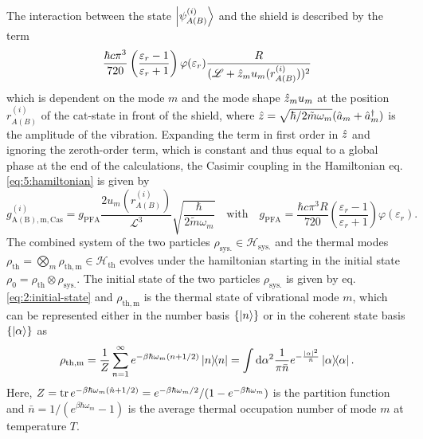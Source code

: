The interaction between the state $\ket{\psi^{(i)}_{A(B)}}$ and the shield is described by the term 
\begin{equation}
  \frac{\hbar c \pi^3}{720}\left(\frac{\varepsilon_r - 1}{\varepsilon_r + 1}\right) \varphi(\varepsilon_r) \frac{R}{(\mathscr{L} + \hat{z}_m u_m(r^{(i)}_{A(B)}))^2}
\end{equation}
which is dependent on the mode $m$ and the mode shape $\hat{z}_m u_m$ at the position $r^{(i)}_{A(B)}$ of the cat-state in front of the shield, where $\hat{z} = \sqrt{\hbar/2\tilde{m}\omega_m}(\hat{a}_m + \hat{a}^\dagger_m)$ is the amplitude of the vibration.
Expanding the term in first order in $\hat{z}$ and ignoring the zeroth-order term, which is constant and thus equal to a global phase at the end of the calculations, the Casimir coupling in the Hamiltonian eq. \eqref{eq:5:hamiltonian} is given by
\begin{equation}
  g^{(i)}_\mathrm{A(B),m,Cas} = g_\mathrm{PFA} \frac{2 u_m(r^{(i)}_{A(B)})}{\mathscr{L}^3} \sqrt{\frac{\hbar}{2\tilde{m}\omega_m}}
  \quad \text{with} \quad 
  g_\mathrm{PFA} = \frac{\hbar c \pi^3 R}{720} \left(\frac{\varepsilon_r - 1}{\varepsilon_r + 1}\right) \varphi(\varepsilon_r) .
\end{equation} 
The combined system of the two particles $\rho_\mathrm{sys.} \in \mathcal{H}_\mathrm{sys.}$ and the thermal modes $\rho_\mathrm{th} = \bigotimes_m \rho_\mathrm{th, m} \in \mathcal{H}_\mathrm{th}$ evolves under the hamiltonian starting in the initial state $\rho_0 = \rho_\mathrm{th} \otimes \rho_\mathrm{sys.}$. 
The initial state of the two particles $\rho_\mathrm{sys.}$ is given by eq. \eqref{eq:2:initial-state} and $\rho_\mathrm{th,m}$ is the thermal state of vibrational mode $m$, which can be represented either in the number basis $\{\ket{n}\}$ or in the coherent state basis $\{\ket{\alpha}\}$ as \cite{Steiner_2024}
\begin{equation}
  \rho_\mathrm{th,m} = \frac{1}{Z} \sum_{n=1}^\infty e^{-\beta \hbar \omega_m (n + 1/2)} \ketbra{n} = \int \dd \alpha^2 \frac{1}{\pi \bar{n}} e^{-\frac{\left\lvert\alpha\right\rvert^2}{\bar{n}}} \ketbra{\alpha} .
\end{equation} 
Here, $Z = \tr e^{-\beta \hbar \omega_m (\hat{n}+1/2)} = e^{-\beta \hbar \omega_m/2}/(1-e^{-\beta \hbar \omega_m})$ is the partition function and $\bar{n} = 1/(e^{\beta \hbar \omega_m} - 1)$ is the average thermal occupation number of mode $m$ at temperature $T$. 

